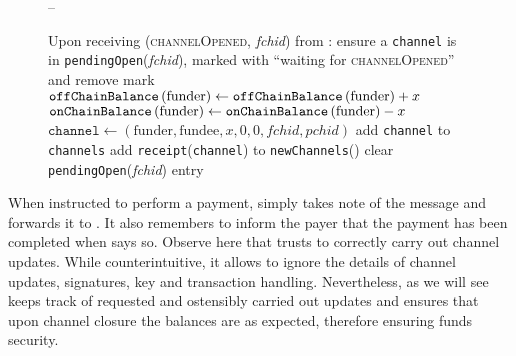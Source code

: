 \begin{figure}[H]
\begin{systembox}{\fpaynet{} -- }
\begin{algorithmic}[1]
        \State Upon receiving (\textsc{channelOpened}, \textit{fchid}) from
        \simulator:
        \Indent
          \State ensure a \texttt{channel} is in
          \texttt{pendingOpen}(\textit{fchid}), marked with ``waiting for
          \textsc{channelOpened}'' and remove mark
          \State $\redden{\mathtt{offChainBalance}}\left(\mathrm{funder}\right)
          \gets \redden{\mathtt{offChainBalance}}\left(\mathrm{funder}\right) +
          x$
          \label{alg:fpaynet:channelOpened:offchain}
          \State $\redden{\mathtt{onChainBalance}}\left(\mathrm{funder}\right)
          \gets \redden{\mathtt{onChainBalance}}\left(\mathrm{funder}\right) -
          x$
          \label{alg:fpaynet:channelOpened:onchain}
          \State $\mathtt{channel} \gets \left(\mathrm{funder}, \mathrm{fundee},
          x, 0, 0, \mathit{fchid}, \mathit{pchid}\right)$
          \State add \texttt{channel} to \texttt{channels}
          \State add \texttt{receipt}(\texttt{channel}) to
          \texttt{newChannels}(\alice)
          \label{alg:fpaynet:channelOpened:report}
          \State clear \texttt{pendingOpen}(\textit{fchid}) entry
        \EndIndent
      \end{algorithmic}
    \end{systembox}
    \caption{}
    \label{alg:fpaynet:open:negotiate}
  \end{figure}

  When instructed to perform a payment, \fpaynet{} simply takes note of the
  message and forwards it to \simulator. It also remembers to inform the payer
  that the payment has been completed when \simulator{} says so. Observe here
  that \fpaynet{} trusts \simulator{} to correctly carry out channel updates.
  While counterintuitive, it allows \fpaynet{} to ignore the details of channel
  updates, signatures, key and transaction handling. Nevertheless, as we will
  see \fpaynet{} keeps track of requested and ostensibly carried out updates and
  ensures that upon channel closure the balances are as expected, therefore
  ensuring funds security.

